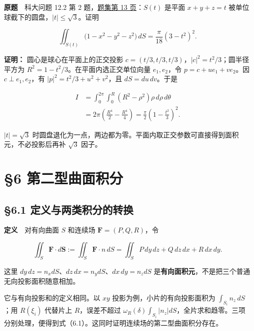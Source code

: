 \documentclass[11pt,a4paper]{article}
\begin{document}
\textbf{原题}　科大问题 12.2 第 2
题，\href{https://zj139.github.io/math-notes/files/problems/科大数分习题-v2\%282\%29.pdf\#page=13}{题集第
13 页}：\(S(t)\) 是平面 \(x+y+z=t\)
被单位球截下的圆盘，\(|t|\le\sqrt3\)。证明

\begin{equation*}
 \iint_{S(t)}\bigl(1-x^2-y^2-z^2\bigr)\,dS
 =\frac\pi{18}(3-t^2)^2.\tag{5.6}
\end{equation*}

\textbf{证明：} 圆心是球心在平面上的正交投影
\(c=(t/3,t/3,t/3)\)，\(|c|^2=t^2/3\)；圆半径平方为
\(R^2=1-t^2/3\)。在平面内选正交单位向量 \(e_1,e_2\)，令
\(p=c+u e_1+v e_2\)。因 \(c\perp e_1,e_2\)，有
\(|p|^2=t^2/3+u^2+v^2\)，且 \(dS=du\,dv\)。于是

\begin{equation*}
\begin{aligned}
 I&=\int_0^{2\pi}\!\int_0^R(R^2-\rho^2)\rho\,d\rho\,d\theta\\
 &=2\pi\left(\frac{R^4}{2}-\frac{R^4}{4}\right)
 =\frac\pi2\left(1-\frac{t^2}{3}\right)^2.
\end{aligned}
\end{equation*}

\(|t|=\sqrt3\)
时圆盘退化为一点，两边都为零。平面内取正交参数可直接得到面积元，不必投影后再补
\(\sqrt3\) 因子。

\section{§6
第二型曲面积分}\label{ux7b2cux4e8cux578bux66f2ux9762ux79efux5206}

\subsection{§6.1
定义与两类积分的转换}\label{ux5b9aux4e49ux4e0eux4e24ux7c7bux79efux5206ux7684ux8f6cux6362}

\textbf{定义}　对有向曲面 \(S\) 和连续场 \(\mathbf F=(P,Q,R)\)，令

\begin{equation*}
 \iint_S\mathbf F\cdot d\mathbf S
 :=\iint_S\mathbf F\cdot n\,dS
 =\iint_S P\,dy\,dz+Q\,dz\,dx+R\,dx\,dy.\tag{6.1}
\end{equation*}

这里 \(dy\,dz=n_xdS\)、\(dz\,dx=n_ydS\)、\(dx\,dy=n_zdS\)
是\textbf{有向面积元}，不是把三个普通无向投影面积随意相加。

它与有向投影和的定义相同。以 \(xy\) 投影为例，小片的有向投影面积为
\(\int_{S_i}n_z\,dS\)；用 \(R(\xi_i)\) 代替片上 \(R\)，误差不超过
\(\omega_R(\delta)\int_{S_i}|n_z|dS\)，全片求和趋零。三项分别处理，便得到式（6.1）。这同时证明连续场的第二型曲面积分存在。
\end{document}
